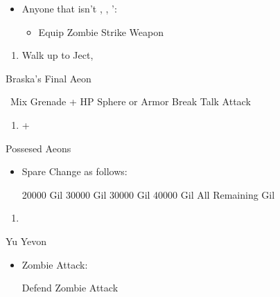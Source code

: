 \begin{multicols}{2}
\begin{equip}
\begin{itemize}
\item Anyone that isn't \tidus, \yuna, \auron':
\begin{itemize}
\item Equip Zombie Strike Weapon
\end{itemize}
\end{itemize}
\end{equip}
\begin{enumerate}[resume]
  \item Walk up to Ject, \cs[4:30]
\end{enumerate}
\begin{battle}[180000]{Braska's Final Aeon}
          \begin{itemize}
            \switch{\yuna}{\rikku}
            \rikkuf \od\ Mix Grenade + HP Sphere or Armor Break
            \tidusf Talk
            \switch{\auron}{\yuna}
            \summon{\bahamut}
            \bahamutf Attack
  \end{itemize}
\end{battle}
\begin{enumerate}[resume]
  \item \cs+\skippablefmv[4:00]
\end{enumerate}
\begin{battle}{Possesed Aeons}
          \begin{itemize}
            \item Spare Change as follows:
                  \begin{itemize}
                    \valeforf \num{20000} Gil
                    \ifritf \num{30000} Gil
                    \ixilonf \num{30000} Gil
                    \bahamutf \num{40000} Gil
                    \shivaf All Remaining Gil
                  \end{itemize}
  \end{itemize}
\end{battle}
\begin{enumerate}[resume]
  \item \cs[1:40]
\end{enumerate}
\begin{battle}[99999]{Yu Yevon}
  \begin{itemize}
   \item Zombie Attack:
   \begin{itemize}
   \yunaf Defend
   \tidusf Zombie Attack
   \end{itemize}

\end{itemize}
\end{battle}
\end{multicols}
